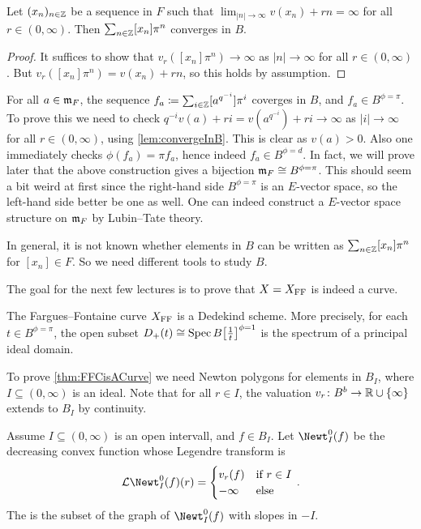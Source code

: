 \documentclass[a4paper, 10pt, oneside, DIV=9, chapterprefix=true, numbers=enddot,bibliography=totoc]{scrbook}
\begin{document}
\begin{lem}\label{lem:convergeInB}
	Let $(x_n)_{n\in\mathbb{Z}}$ be a sequence in $F$ such that $\lim_{|n|\to\infty}v(x_n)+rn=\infty$ for all $r\in(0,\infty)$. Then $\sum_{n\in\mathbb{Z}}[x_n]\pi^n$ converges in $B$.
\end{lem}
\begin{proof}
	It suffices to show that $v_r([x_n]\pi^n)\to\infty$ as $|n|\to\infty$ for all $r\in(0,\infty)$. But $v_r([x_n]\pi^n)=v(x_n)+rn$, so this holds by assumption.
\end{proof}
\begin{rem}
	\begin{numerate}
		\item For all $a\in \mathfrak{m}_F$, the sequence $f_a\coloneqq \sum_{i\in\mathbb{Z}}[a^{q^{-i}}]\pi^i$ coverges in $B$, and $f_a\in B^{\phi=\pi}$. To prove this we need to check $q^{-i}v(a)+ri=v(a^{q^{-i}})+ri\to \infty$ as $|i|\to\infty$ for all $r\in(0,\infty)$, using \cref{lem:convergeInB}. This is clear as $v(a)>0$. Also one immediately checks $\phi(f_a)=\pi f_a$, hence indeed $f_a\in B^{\phi=d}$. In fact, we will prove later that the above construction gives a bijection $\mm_F\cong B^{\phi=\pi}$. This should seem a bit weird at first since the right-hand side $B^{\phi=\pi}$ is an $E$-vector space, so the left-hand side better be one as well. One can indeed construct a $E$-vector space structure on $\mathfrak{m}_F$ by Lubin--Tate theory.
		\item In general, it is not known whether elements in $B$ can be written as $\sum_{n\in\mathbb{Z}}[x_n]\pi^n$ for $[x_n]\in F$. So we need different tools to study $B$.
	\end{numerate}
\end{rem}
The goal for the next few lectures is to prove that $X=X_{\mathrm{FF}}$ is indeed a curve.
\begin{thm}\label{thm:FFCisACurve}
	The Fargues--Fontaine curve $X_{\mathrm{FF}}$ is a Dedekind scheme. More precisely, for each $t\in B^{\phi=\pi}$, the open subset $D_+(t)\cong \Spec B\big[\frac 1t\big]^{\phi=1}$ is the spectrum of a principal ideal domain.
\end{thm}
To prove \cref{thm:FFCisACurve} we need Newton polygons for elements in $B_I$, where $I\subseteq (0,\infty)$ is an ideal. Note that for all $r\in I$, the valuation $v_r\colon B^b\morphism \IR\cup\{\infty\}$ extends to $B_I$ by continuity.
\begin{defi}\label{def:NewtOpen}
	Assume $I\subseteq (0,\infty)$ is an open intervall, and $f\in B_I$. Let $\Newt_I^0(f)$ be the decreasing convex function whose Legendre transform is
	\begin{equation*}
		\Ll\Newt_I^0(f)(r)=\begin{cases}
		v_r(f) & \text{if }r\in I\\
		-\infty & \text{else}
		\end{cases}\,.
	\end{equation*}
	The  is the subset of the graph of $\Newt_I^0(f)$ with slopes in $-I$.
\end{defi}
\end{document}
